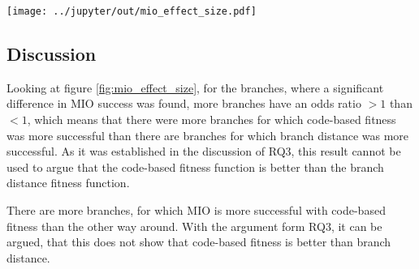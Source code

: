 \begin{minipage}{\textwidth}
	\centering
	\texttt{[image: ../jupyter/out/mio\_effect\_size.pdf]}
	\label{fig:mio_effect_size}
\end{minipage}

\subsection{Discussion}

Looking at figure \ref{fig:mio_effect_size}, for the branches, where a significant difference in MIO success was found, more branches have an odds ratio $> 1$ than $< 1$, which means that there were more branches for which code-based fitness was more successful than there are branches for which branch distance was more successful.
As it was established in the discussion of RQ3, this result cannot be used to argue that the code-based fitness function is better than the branch distance fitness function.

\begin{mdframed}[style=box, frametitle={Summary RQ4:}]
	There are more branches, for which MIO is more successful with code-based fitness than the other way around. With the argument form RQ3, it can be argued, that this does not show that code-based fitness is better than branch distance.
\end{mdframed}